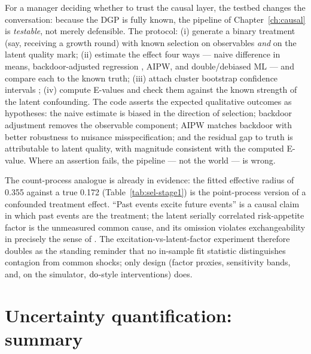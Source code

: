 For a manager deciding whether to trust the causal layer, the testbed changes the conversation: because the
DGP is fully known, the pipeline of Chapter~\ref{ch:causal} is \emph{testable}, not merely defensible. The
protocol: (i) generate a binary treatment (say, receiving a growth round) with known selection on
observables \emph{and} on the latent quality mark; (ii) estimate the effect four ways --- naive difference in
means, backdoor-adjusted regression \cite{pearl1995}, AIPW, and double/debiased ML
\cite{imbens2015,chernozhukov2018} --- and compare each to the known truth; (iii) attach cluster bootstrap
confidence intervals \cite{efron1994}; (iv) compute E-values \cite{vanderweele2017} and check them against
the known strength of the latent confounding. The code asserts the expected qualitative outcomes as
hypotheses: the naive estimate is biased in the direction of selection; backdoor adjustment removes the
observable component; AIPW matches backdoor with better robustness to nuisance misspecification; and the
residual gap to truth is attributable to latent quality, with magnitude consistent with the computed
E-value. Where an assertion fails, the pipeline --- not the world --- is wrong.

The count-process analogue is already in evidence: the fitted effective radius of 0.355 against a true 0.172
(Table~\ref{tab:sel-stage1}) is the point-process version of a confounded treatment effect. ``Past events
excite future events'' is a causal claim in which past events are the treatment; the latent serially
correlated risk-appetite factor is the unmeasured common cause, and its omission violates exchangeability in
precisely the sense of \cite{hernan2020}. The excitation-vs-latent-factor experiment therefore doubles as
the standing reminder that no in-sample fit statistic distinguishes contagion from common shocks; only
design (factor proxies, sensitivity bands, and, on the simulator, $\mathrm{do}$-style interventions) does.

\section{Uncertainty quantification: summary}
\label{sec:sel-uq}


